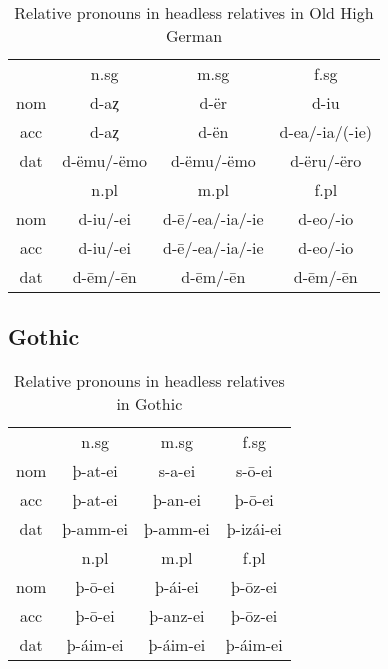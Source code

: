 \begin{table}[h]\label{tbl:paradigmohg}
	\center
	\caption {Relative pronouns in headless relatives in Old High German}
		\begin{tabular}{cccc}
		\toprule
							& \ac{n}.\ac{sg}	    & \ac{m}.\ac{sg}  & \ac{f}.\ac{sg}			\\
								\cmidrule{2-4}
		\ac{nom} & d-aȥ          	& d-ër       	& d-iu						\\
		\ac{acc}	& d-aȥ   					& d-ën				& d-ea/-ia/(-ie)	\\
		\ac{dat}	& d-ëmu/-ëmo	    & d-ëmu/-ëmo	& d-ëru/-ëro			\\
		\bottomrule
	    				& \ac{n}.\ac{pl} & \ac{m}.\ac{pl}       & \ac{f}.\ac{pl}      \\
	    					\cmidrule{2-4}
    \ac{nom} & d-iu/-ei   &  d-ē/-ea/-ia/-ie & d-eo/-io        \\
    \ac{acc} & d-iu/-ei   &  d-ē/-ea/-ia/-ie & d-eo/-io        \\
    \ac{dat} & d-ēm/-ēn   &  d-ēm/-ēn        & d-ēm/-ēn        \\
    \bottomrule
		\end{tabular}
\end{table}


\subsection{Gothic}


\begin{table}[h]
	\center
	\caption {Relative pronouns in headless relatives in Gothic}
		\begin{tabular}{cccc}
		\toprule
							& \ac{n}.\ac{sg} 	& \ac{m}.\ac{sg}	& \ac{f}.\ac{sg}   \\
		 						\cmidrule{2-4}
    \ac{nom} & þ-at-ei 	 	& s-a-ei 			& s-ō-ei			\\
    \ac{acc}	& þ-at-ei    	& þ-an-ei  		& þ-ō-ei  		\\
    \ac{dat} & þ-amm-ei 		& þ-amm-ei		& þ-izái-ei 	\\
		\bottomrule
    					& \ac{n}.\ac{pl}	& \ac{m}.\ac{pl}	& \ac{f}.\ac{pl}	\\
						    \cmidrule{2-4}
    \ac{nom} & þ-ō-ei			&	þ-ái-ei			&	þ-ōz-ei			\\
    \ac{acc} & þ-ō-ei 			&	þ-anz-ei		&	þ-ōz-ei			\\
    \ac{dat} & þ-áim-ei		&	þ-áim-ei 		&	þ-áim-ei 		\\
    \bottomrule
		\end{tabular}
\end{table}


